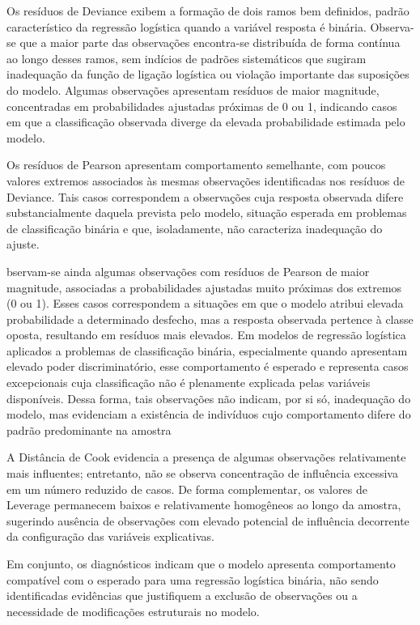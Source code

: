 \documentclass[
  brazilian,
  12pt,
  letterpaper,
  DIV=11,
  numbers=noendperiod]{scrartcl}
\begin{document}
Os resíduos de Deviance exibem a formação de dois ramos bem definidos,
padrão característico da regressão logística quando a variável resposta
é binária. Observa-se que a maior parte das observações encontra-se
distribuída de forma contínua ao longo desses ramos, sem indícios de
padrões sistemáticos que sugiram inadequação da função de ligação
logística ou violação importante das suposições do modelo. Algumas
observações apresentam resíduos de maior magnitude, concentradas em
probabilidades ajustadas próximas de 0 ou 1, indicando casos em que a
classificação observada diverge da elevada probabilidade estimada pelo
modelo.

Os resíduos de Pearson apresentam comportamento semelhante, com poucos
valores extremos associados às mesmas observações identificadas nos
resíduos de Deviance. Tais casos correspondem a observações cuja
resposta observada difere substancialmente daquela prevista pelo modelo,
situação esperada em problemas de classificação binária e que,
isoladamente, não caracteriza inadequação do ajuste.

bservam-se ainda algumas observações com resíduos de Pearson de maior
magnitude, associadas a probabilidades ajustadas muito próximas dos
extremos (0 ou 1). Esses casos correspondem a situações em que o modelo
atribui elevada probabilidade a determinado desfecho, mas a resposta
observada pertence à classe oposta, resultando em resíduos mais
elevados. Em modelos de regressão logística aplicados a problemas de
classificação binária, especialmente quando apresentam elevado poder
discriminatório, esse comportamento é esperado e representa casos
excepcionais cuja classificação não é plenamente explicada pelas
variáveis disponíveis. Dessa forma, tais observações não indicam, por si
só, inadequação do modelo, mas evidenciam a existência de indivíduos
cujo comportamento difere do padrão predominante na amostra

A Distância de Cook evidencia a presença de algumas observações
relativamente mais influentes; entretanto, não se observa concentração
de influência excessiva em um número reduzido de casos. De forma
complementar, os valores de Leverage permanecem baixos e relativamente
homogêneos ao longo da amostra, sugerindo ausência de observações com
elevado potencial de influência decorrente da configuração das variáveis
explicativas.

Em conjunto, os diagnósticos indicam que o modelo apresenta
comportamento compatível com o esperado para uma regressão logística
binária, não sendo identificadas evidências que justifiquem a exclusão
de observações ou a necessidade de modificações estruturais no modelo.
\end{document}

